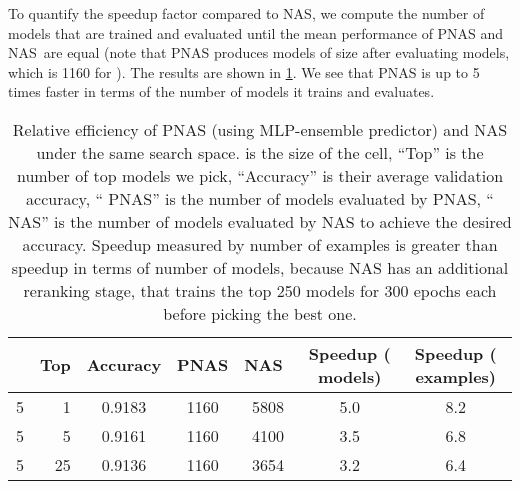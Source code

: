 \documentclass[runningheads]{llncs}
\newcommand{\NAS}{NAS}
\newcommand{\NASRL}{\NAS}
\begin{document}
To quantify the speedup factor compared to \NASRL,
we compute the number of models that are trained and evaluated until
the mean performance of PNAS and \NASRL\ are equal
(note that PNAS produces models of size 
after evaluating
  models, which is  1160 for ).
The results are shown in
\cref{tab:speedup}.
We see that PNAS is up to 5 times faster in terms of the number of models
it trains and evaluates.


\begin{table}[t]
    \begin{center}
    \begin{tabular}{l|r|c|c|c|c|c}
    \toprule
     & Top & Accuracy & \;PNAS & \;\NASRL\ & Speedup ( models) & Speedup ( examples) \\ 
    \midrule
    5 & 1 & 0.9183 & 1160 & 5808 & 5.0 & 8.2 \\
    5 & 5 & 0.9161 & 1160 & 4100 & 3.5 & 6.8 \\
    5 & 25 & 0.9136 & 1160 & 3654 & 3.2 & 6.4 \\ 
\bottomrule
    \end{tabular}
    \end{center}
    \caption{Relative efficiency of PNAS (using MLP-ensemble predictor) and NAS under the same search space.
     is the size of the cell, 
    ``Top'' is the number of top models we pick,
    ``Accuracy'' is their average validation accuracy,
    `` PNAS'' is the number of models evaluated by PNAS,
    `` NAS'' is the number of models evaluated by NAS to achieve the desired accuracy.
Speedup measured by number of examples is greater than speedup in terms of number of models, because NAS has an additional reranking stage, that trains the top 250 models for 300 epochs each before picking the best one.
    }
    \label{tab:speedup}
\end{table}
\end{document}
